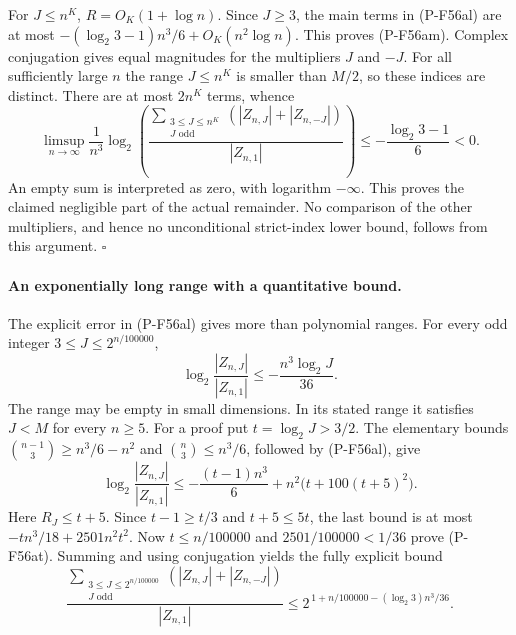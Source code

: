 \documentclass[11pt,a4paper]{article}
\begin{document}
For $J\le n^K$, $R=O_K(1+\log n)$.
Since $J\ge3$, the main terms in (P-F56al) are at most
$-(\log_2 3-1)n^3/6+O_K(n^2\log n)$.
This proves (P-F56am). Complex conjugation gives equal
magnitudes for the multipliers $J$ and $-J$.
For all sufficiently large $n$ the range $J\le n^K$
is smaller than $M/2$, so these indices are distinct.
There are at most $2n^K$ terms, whence
\[
 \limsup_{n\to\infty}\frac1{n^3}\log_2
 \left(
 \frac{\displaystyle\sum_{\substack{3\le J\le n^K\\J\text{ odd}}}
       (|Z_{n,J}|+|Z_{n,-J}|)}{|Z_{n,1}|}
 \right)
 \le-\frac{\log_2 3-1}{6}<0.
 \tag{P-F56as}
\]
An empty sum is interpreted as zero, with logarithm
$-\infty$. This proves the claimed negligible part
of the actual remainder. No comparison of the other
multipliers, and hence no unconditional strict-index
lower bound, follows from this argument.
\hfill$\square$

\paragraph{An exponentially long range with a quantitative bound.}
The explicit error in (P-F56al) gives more than polynomial
ranges. For every odd integer $3\le J\le2^{n/100000}$,
\[
       \log_2\frac{|Z_{n,J}|}{|Z_{n,1}|}
                      \le-\frac{n^3\log_2 J}{36}.
 \tag{P-F56at}
\]
The range may be empty in small dimensions. In its stated
range it satisfies $J<M$ for every $n\ge5$.
For a proof put $t=\log_2J>3/2$. The elementary bounds
$\binom{n-1}{3}\ge n^3/6-n^2$ and
$\binom n3\le n^3/6$, followed by (P-F56al), give
\[
 \log_2\frac{|Z_{n,J}|}{|Z_{n,1}|}
 \le-\frac{(t-1)n^3}{6}
                      +n^2\bigl(t+100(t+5)^2\bigr).
\]
Here $R_J\le t+5$. Since $t-1\ge t/3$ and
$t+5\le5t$, the last bound is at most
$-tn^3/18+2501n^2t^2$.
Now $t\le n/100000$ and $2501/100000<1/36$ prove
(P-F56at). Summing and using conjugation yields the
fully explicit bound
\[
 \frac{\displaystyle\sum_{\substack{3\le J\le2^{n/100000}\\
                                  J\text{ odd}}}
       (|Z_{n,J}|+|Z_{n,-J}|)}{|Z_{n,1}|}
 \le 2^{\,1+n/100000-(\log_2 3)n^3/36}.
 \tag{P-F56au}
\]
\end{document}
